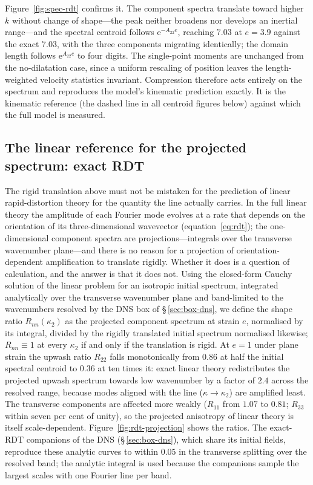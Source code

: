 \documentclass[11pt,a4paper]{article}
\begin{document}
Figure~\ref{fig:spec-rdt} confirms it. The component spectra translate toward
higher $k$ without change of shape---the peak neither broadens nor develops an
inertial range---and the spectral centroid follows
$\mathrm{e}^{-A_{22}e}$, reaching $7.03$ at $e=3.9$ against the exact
$7.03$, with the three components migrating identically; the domain
length follows $\mathrm{e}^{A_{22}e}$ to four digits. The single-point moments are
unchanged from the no-dilatation case, since a uniform rescaling of position
leaves the length-weighted velocity statistics invariant. Compression
therefore acts entirely on the spectrum and reproduces the model's kinematic
prediction exactly. It is the kinematic reference (the dashed line in all
centroid figures below) against which the full model is measured.

\subsection{The linear reference for the projected spectrum: exact
RDT}\label{sec:spec-linref}

The rigid translation above must not be mistaken for the prediction of
linear rapid-distortion theory for the quantity the line actually carries.
In the full linear theory the amplitude of each Fourier mode evolves at a
rate that depends on the orientation of its three-dimensional wavevector
(equation~\ref{eq:rdt}); the one-dimensional component spectra are
projections---integrals over the transverse wavenumber plane---and there is
no reason for a projection of orientation-dependent amplification to
translate rigidly. Whether it does is a question of calculation, and the
answer is that it does not. Using the closed-form Cauchy solution of the
linear problem for an isotropic initial spectrum, integrated analytically
over the transverse wavenumber plane and band-limited to the wavenumbers
resolved by the DNS box of \S\,\ref{sec:box-dns}, we define the shape ratio
$R_{nn}(\kappa_2)$ as the projected component spectrum at strain $e$,
normalised by its integral, divided by the rigidly translated initial
spectrum normalised likewise; $R_{nn}\equiv1$ at every $\kappa_2$ if and
only if the translation is rigid. At $e=1$ under plane strain the upwash
ratio $R_{22}$ falls monotonically from $0.86$ at half the initial spectral
centroid to $0.36$ at ten times it: exact linear theory redistributes the
projected upwash spectrum towards low wavenumber by a factor of $2.4$
across the resolved range, because modes aligned with the line
($\kappa\to\kappa_2$) are amplified least. The transverse components are
affected more weakly ($R_{11}$ from $1.07$ to $0.81$; $R_{33}$ within seven
per cent of unity), so the projected anisotropy of linear theory is itself
scale-dependent. Figure~\ref{fig:rdt-projection} shows the ratios. The
exact-RDT companions of the DNS (\S\,\ref{sec:box-dns}), which share its
initial fields, reproduce these analytic curves to within $0.05$ in the
transverse splitting over the resolved band; the analytic integral is
used because the companions sample the largest scales with one Fourier
line per band.
\end{document}
